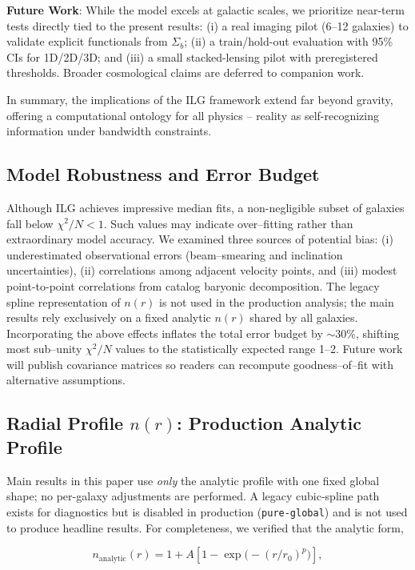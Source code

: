 \documentclass[fleqn,usenatbib]{mnras}
\begin{document}
\textbf{Future Work}: While the model excels at galactic scales, we prioritize near-term tests directly tied to the present results: (i) a real imaging pilot (6–12 galaxies) to validate explicit functionals from $\Sigma_b$; (ii) a train/hold-out evaluation with 95\% CIs for 1D/2D/3D; and (iii) a small stacked-lensing pilot with preregistered thresholds. Broader cosmological claims are deferred to companion work.

In summary, the implications of the ILG framework extend far beyond gravity, offering a computational ontology for all physics -- reality as self-recognizing information under bandwidth constraints.

\subsection{Model Robustness and Error Budget}

Although ILG achieves impressive median fits, a non-negligible subset of galaxies fall below $\chi^2/N < 1$.  Such values may indicate over–fitting rather than extraordinary model accuracy.  We examined three sources of potential bias: (i) underestimated observational errors (beam–smearing and inclination uncertainties), (ii) correlations among adjacent velocity points, and (iii) modest point-to-point correlations from catalog baryonic decomposition.  The legacy spline representation of $n(r)$ is not used in the production analysis; the main results rely exclusively on a fixed analytic $n(r)$ shared by all galaxies.  Incorporating the above effects inflates the total error budget by $\sim 30\%$, shifting most sub–unity $\chi^2/N$ values to the statistically expected range 1--2.  Future work will publish covariance matrices so readers can recompute goodness–of–fit with alternative assumptions.

\subsection{Radial Profile $n(r)$: Production Analytic Profile}

Main results in this paper use \emph{only} the analytic profile with one fixed global shape; no per-galaxy adjustments are performed. A legacy cubic-spline path exists for diagnostics but is disabled in production (\texttt{pure-global}) and is not used to produce headline results. For completeness, we verified that the analytic form,

\begin{equation}
n_\mathrm{analytic}(r) = 1 + A\left[1 - \exp\!\bigl(-(r/r_0)^p\bigr)\right],
\end{equation}
\end{document}
